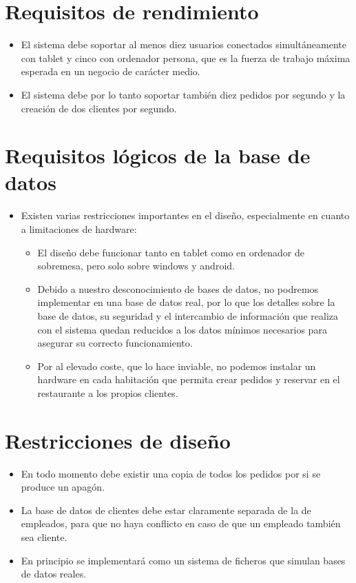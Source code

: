 \documentclass[spanish,a4paper,11pt, twoside]{report}	%
\begin{document}
\section{Requisitos de rendimiento}
\begin{itemize}
	\item El sistema debe soportar al menos diez usuarios conectados simultáneamente con tablet y cinco con ordenador persona, que es la fuerza de trabajo máxima esperada en un negocio de carácter medio.
	\item El sistema debe por lo tanto soportar también diez pedidos por segundo y la creación de dos clientes por segundo. 
\end{itemize}

\section{Requisitos lógicos de la base de datos}
\begin{itemize}
	\item Existen varias restricciones importantes en el diseño, especialmente en cuanto a limitaciones de hardware:
	\begin{itemize}
		\item El diseño debe funcionar tanto en tablet como en ordenador de sobremesa,  pero solo sobre windows y android.
		\item Debido a nuestro desconocimiento de bases de datos, no podremos implementar en una base de datos real, por lo que los detalles sobre la base de datos, su seguridad y el intercambio de información que realiza con el sistema quedan reducidos a los datos mínimos necesarios para asegurar su correcto funcionamiento.
		\item Por al elevado coste, que lo hace inviable, no podemos instalar un hardware en cada habitación que permita crear pedidos y reservar en el restaurante a los propios clientes.

	\end{itemize}
\end{itemize}

\section{Restricciones de diseño}
\begin{itemize}
	\item En todo momento debe existir una copia de todos los pedidos por si se produce 	un apagón.
	\item La base de datos de clientes debe estar claramente separada de la de empleados, para que no haya conflicto en caso de que un empleado también sea cliente.
	\item En principio se implementará como un sistema de ficheros que simulan bases de datos reales.
\end{itemize}
\end{document}
